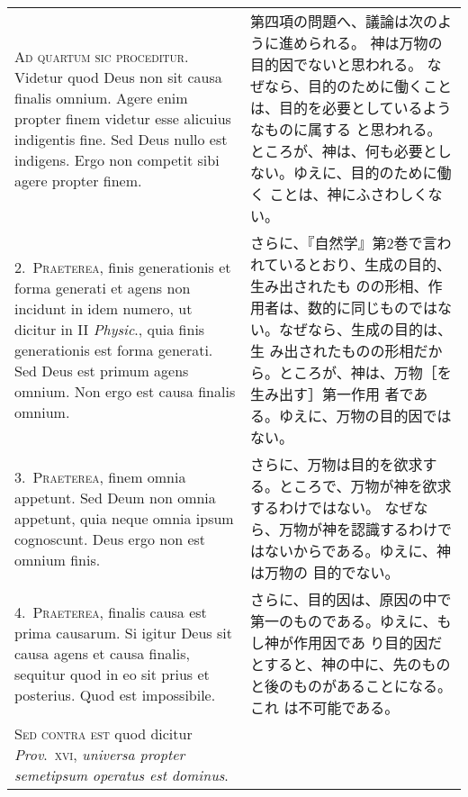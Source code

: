 \documentclass[10pt]{jsarticle} %
\begin{document}
\begin{longtable}{p{21em}p{21em}}
{\huge A}{\scshape d quartum sic proceditur}. Videtur quod
Deus non sit causa finalis omnium. Agere enim propter finem videtur esse
alicuius indigentis fine. Sed Deus nullo est indigens. Ergo non competit
sibi agere propter finem.

&

第四項の問題へ、議論は次のように進められる。
神は万物の目的因でないと思われる。
なぜなら、目的のために働くことは、目的を必要としているようなものに属する
 と思われる。ところが、神は、何も必要としない。ゆえに、目的のために働く
 ことは、神にふさわしくない。

\\


2.~{\scshape Praeterea}, finis generationis et forma generati et agens
non incidunt in idem numero, ut dicitur in II {\itshape Physic}., quia
finis generationis est forma generati. Sed Deus est primum agens
omnium. Non ergo est causa finalis omnium.

&

さらに、『自然学』第2巻で言われているとおり、生成の目的、生み出されたも
 のの形相、作用者は、数的に同じものではない。なぜなら、生成の目的は、生
 み出されたものの形相だから。ところが、神は、万物［を生み出す］第一作用
 者である。ゆえに、万物の目的因ではない。

\\


3.~{\scshape Praeterea}, finem omnia appetunt. Sed Deum
non omnia appetunt, quia neque omnia ipsum cognoscunt. Deus ergo non est
omnium finis.

&

さらに、万物は目的を欲求する。ところで、万物が神を欲求するわけではない。
 なぜなら、万物が神を認識するわけではないからである。ゆえに、神は万物の
 目的でない。

\\

4.~{\scshape Praeterea}, finalis causa est prima
causarum. Si igitur Deus sit causa agens et causa finalis, sequitur quod
in eo sit prius et posterius. Quod est impossibile.

&
さらに、目的因は、原因の中で第一のものである。ゆえに、もし神が作用因であ
 り目的因だとすると、神の中に、先のものと後のものがあることになる。これ
 は不可能である。

\\

{\scshape Sed contra est} quod dicitur {\itshape Prov}.~{\scshape xvi},
{\itshape universa propter semetipsum operatus est dominus}.


\end{longtable}
\end{document}
